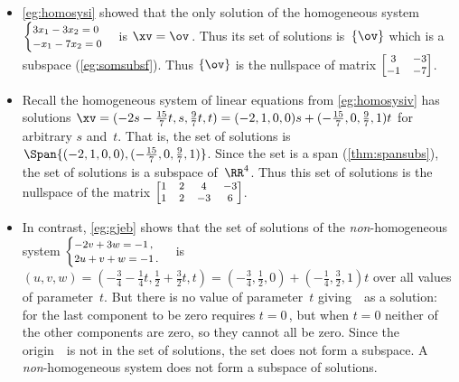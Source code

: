 \begin{example} \label{eg:nullsp}
\begin{itemize}
\item  \autoref{eg:homosysi} showed that the only solution of the homogeneous system \(\footnotesize\begin{cases}
3x_1-3x_2=0\\-x_1-7x_2=0
\end{cases}\) is \(\xv=\ov\)\,.
Thus its set of solutions is~\(\{\ov\}\) which is a subspace (\autoref{eg:somsubsf}).
Thus \(\{\ov\}\) is the nullspace of matrix \(\footnotesize\begin{bmatrix} 3&-3\\-1&-7 \end{bmatrix}\).

\item Recall the homogeneous system of linear equations from \autoref{eg:homosysiv} has solutions \(\xv=(-2s-\frac{15}7t,s,\frac97t,t) =(-2,1,0,0)s+(-\frac{15}7,0,\frac97,1)t\) for arbitrary \(s\) and~\(t\).
That is, the set of solutions is \(\Span\{(-2,1,0,0),(-\frac{15}7,0,\frac97,1)\}\).
Since the set is a span (\autoref{thm:spansubs}), the set of solutions is a subspace of~\(\RR^4\).
Thus this set of solutions is the nullspace of the matrix \(\footnotesize\begin{bmatrix} 1&2&4&-3\\
1&2&-3&6 \end{bmatrix}\).

\item In contrast, \autoref{eg:gjeb} shows that the set of solutions of the \emph{non}-homogeneous system \(\footnotesize\begin{cases}
-2v+3w=-1\,,\\2u+v+w=-1\,.
\end{cases}\)
is \((u,v,w)=(-\frac34-\frac14t,\frac12+\frac32t,t)
=(-\frac34,\frac12,0)+(-\frac14,\frac32,1)t\)
over all values of parameter~\(t\).
But there is no value of parameter~\(t\) giving~\ov\ as a solution: for the last component to be zero requires \(t=0\)\,, but when \(t=0\) neither of the other components are zero, so they cannot all be zero.
Since the origin~\ov\ is not in the set of solutions, the set does not form a subspace. 
A \emph{non}-homogeneous system does not form a subspace of solutions.
\end{itemize}
\end{example}


